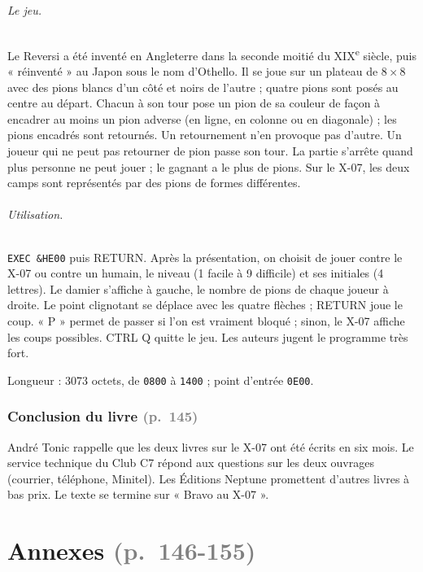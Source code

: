 \documentclass[a4paper,10pt]{article}
\newcommand{\hex}[1]{\texttt{#1}}
\newcommand{\pg}[1]{\texorpdfstring{\textcolor{gray}{\small(p.~#1)}}{}}
\begin{document}
\paragraph{Le jeu.} Le Reversi a été inventé en Angleterre dans la seconde
moitié du XIX\textsuperscript{e} siècle, puis « réinventé » au Japon sous le
nom d'Othello. Il se joue sur un plateau de $8\times8$ avec des pions blancs
d'un côté et noirs de l'autre ; quatre pions sont posés au centre au départ.
Chacun à son tour pose un pion de sa couleur de façon à encadrer au moins un
pion adverse (en ligne, en colonne ou en diagonale) ; les pions encadrés sont
retournés. Un retournement n'en provoque pas d'autre. Un joueur qui ne peut
pas retourner de pion passe son tour. La partie s'arrête quand plus personne
ne peut jouer ; le gagnant a le plus de pions. Sur le X-07, les deux camps
sont représentés par des pions de formes différentes.

\paragraph{Utilisation.} \texttt{EXEC \&HE00} puis RETURN. Après la
présentation, on choisit de jouer contre le X-07 ou contre un humain, le
niveau (1 facile à 9 difficile) et ses initiales (4 lettres). Le damier
s'affiche à gauche, le nombre de pions de chaque joueur à droite. Le point
clignotant se déplace avec les quatre flèches ; RETURN joue le coup. « P »
permet de passer si l'on est vraiment bloqué ; sinon, le X-07 affiche les
coups possibles. CTRL Q quitte le jeu. Les auteurs jugent le programme très
fort.

Longueur : 3073 octets, de \hex{0800} à \hex{1400} ; point d'entrée
\hex{0E00}.

\section{Conclusion du livre \pg{145}}
André Tonic rappelle que les deux livres sur le X-07 ont été écrits en six
mois. Le service technique du Club C7 répond aux questions sur les deux
ouvrages (courrier, téléphone, Minitel). Les Éditions Neptune promettent
d'autres livres à bas prix. Le texte se termine sur « Bravo au X-07 ».

\part*{Annexes \pg{146-155}}
\end{document}
